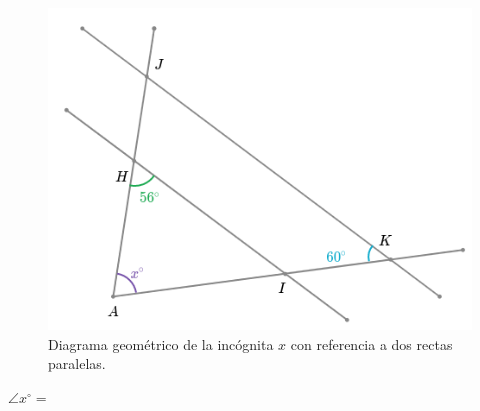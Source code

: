 \begin{minipage}[b]{0.42\textwidth}
    \begin{figure}[H]
        \includegraphics[width=\linewidth]{Images/triangle_angle_04}
        \caption{Diagrama geométrico de la inc\'ognita $x$ con referencia a dos rectas paralelas.}
        \label{fig:triangle_angle_04}
    \end{figure}
    \begin{center}
        {\color{purplePoint}\textbf{$\angle x^\circ =$}} \fbox{
        \begin{minipage}{2cm}
            \hfill\vspace{0.5cm}
        \end{minipage}
        }
    \end{center}

\end{minipage}
